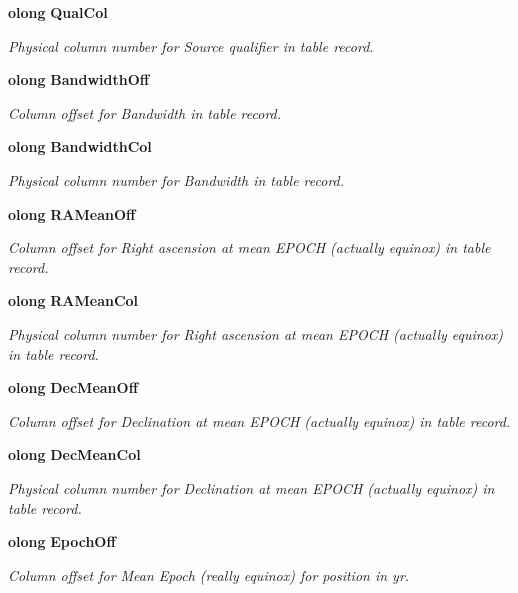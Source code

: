 \begin{CompactItemize}
{\bf olong} {\bf Qual\-Col}
\begin{CompactList}\small\item\em Physical column number for Source qualifier in table record. \item\end{CompactList}\item 
{\bf olong} {\bf Bandwidth\-Off}
\begin{CompactList}\small\item\em Column offset for Bandwidth in table record. \item\end{CompactList}\item 
{\bf olong} {\bf Bandwidth\-Col}
\begin{CompactList}\small\item\em Physical column number for Bandwidth in table record. \item\end{CompactList}\item 
{\bf olong} {\bf RAMean\-Off}
\begin{CompactList}\small\item\em Column offset for Right ascension at mean EPOCH (actually equinox) in table record. \item\end{CompactList}\item 
{\bf olong} {\bf RAMean\-Col}
\begin{CompactList}\small\item\em Physical column number for Right ascension at mean EPOCH (actually equinox) in table record. \item\end{CompactList}\item 
{\bf olong} {\bf Dec\-Mean\-Off}
\begin{CompactList}\small\item\em Column offset for Declination at mean EPOCH (actually equinox) in table record. \item\end{CompactList}\item 
{\bf olong} {\bf Dec\-Mean\-Col}
\begin{CompactList}\small\item\em Physical column number for Declination at mean EPOCH (actually equinox) in table record. \item\end{CompactList}\item 
{\bf olong} {\bf Epoch\-Off}
\begin{CompactList}\small\item\em Column offset for Mean Epoch (really equinox) for position in yr. \item\end{CompactList}\item 

\end{CompactItemize}
